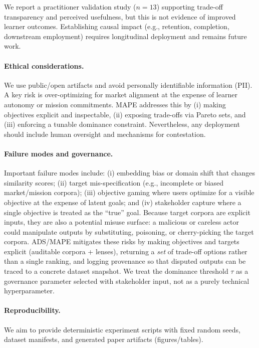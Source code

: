 \documentclass[sigconf,review]{acmart}
\newif\ifdraft
\newcommand{\draftonly}[1]{\ifdraft #1\fi}
\newcommand{\todo}[1]{\textcolor{red}{\textbf{[TODO: #1]}}}
\newcommand{\ADS}{\textsc{ADS}\xspace}
\newcommand{\MAPE}{\textsc{MAPE}\xspace}
\begin{document}
We report a practitioner validation study ($n{=}13$) supporting trade-off transparency and perceived usefulness, but this is not evidence of improved learner outcomes. Establishing causal impact (e.g., retention, completion, downstream employment) requires longitudinal deployment and remains future work.

\paragraph{Ethical considerations.}
We use public/open artifacts and avoid personally identifiable information (PII). A key risk is over-optimizing for market alignment at the expense of learner autonomy or mission commitments. \MAPE addresses this by (i) making objectives explicit and inspectable, (ii) exposing trade-offs via Pareto sets, and (iii) enforcing a tunable dominance constraint. Nevertheless, any deployment should include human oversight and mechanisms for contestation.

\paragraph{Failure modes and governance.}
Important failure modes include: (i) {embedding bias} or domain shift that changes similarity scores; (ii) {target mis-specification} (e.g., incomplete or biased market/mission corpora); (iii) {objective gaming} where users optimize for a visible objective at the expense of latent goals; and (iv) {stakeholder capture} where a single objective is treated as the ``true'' goal. Because target corpora are explicit inputs, they are also a potential misuse surface: a malicious or careless actor could manipulate outputs by substituting, poisoning, or cherry-picking the target corpora. \ADS/\MAPE mitigates these risks by making objectives and targets explicit (auditable corpora + lenses), returning a \emph{set} of trade-off options rather than a single ranking, and logging provenance so that disputed outputs can be traced to a concrete dataset snapshot. We treat the dominance threshold $\tau$ as a governance parameter selected with stakeholder input, not as a purely technical hyperparameter.

\paragraph{Reproducibility.}
We aim to provide deterministic experiment scripts with fixed random seeds, dataset manifests, and generated paper artifacts (figures/tables). \draftonly{\todo{Add concrete commands + seeds once repo is frozen.}}
\end{document}
